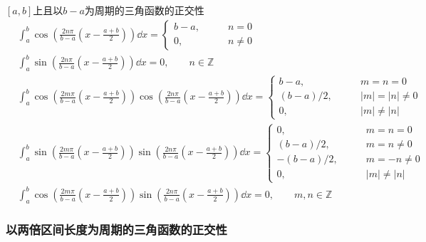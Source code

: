 \documentclass[lang = cn, scheme = chinese, thmcnt = section]{elegantbook}
\newcommand{\Z}{\mathbb{Z}}            %
\begin{document}
\begin{theorem}{$[a,b]$上且以$b-a$为周期的三角函数的正交性}
	\begin{align*}
		& \int_{a}^{b}\cos \left(\frac{2n\pi}{b-a}\left(x-\frac{a+b}{2}\right)\right)\dd x=\begin{cases}
			b-a,\qquad & n=0\\
			0,\qquad & n\ne 0
		\end{cases}\\
		& \int_{a}^{b}\sin \left(\frac{2n\pi}{b-a}\left(x-\frac{a+b}{2}\right)\right)\dd x=0,\qquad n\in\Z\\
		& \int_{a}^{b}\cos \left(\frac{2m\pi}{b-a}\left(x-\frac{a+b}{2}\right)\right)\cos \left(\frac{2n\pi}{b-a}\left(x-\frac{a+b}{2}\right)\right) \dd x=\begin{cases}
			b-a,\qquad & m=n=0\\
			(b-a)/2,\qquad & |m|=|n|\ne 0\\
			0,\qquad & |m|\ne |n|
		\end{cases}\\
		& \int_{a}^{b}\sin \left(\frac{2m\pi}{b-a}\left(x-\frac{a+b}{2}\right)\right)\sin \left(\frac{2n\pi}{b-a}\left(x-\frac{a+b}{2}\right)\right) \dd x=\begin{cases}
			0,\qquad & m=n=0\\
			(b-a)/2,\qquad & m=n\ne 0\\
			-(b-a)/2,\qquad & m=-n\ne 0\\
			0,\qquad & |m|\ne |n|
		\end{cases}\\
		& \int_{a}^{b}\cos \left(\frac{2m\pi}{b-a}\left(x-\frac{a+b}{2}\right)\right)\sin \left(\frac{2n\pi}{b-a}\left(x-\frac{a+b}{2}\right)\right) \dd x=0,\qquad m,n\in\Z
	\end{align*}
\end{theorem}

\subsubsection{以两倍区间长度为周期的三角函数的正交性}
\end{document}
